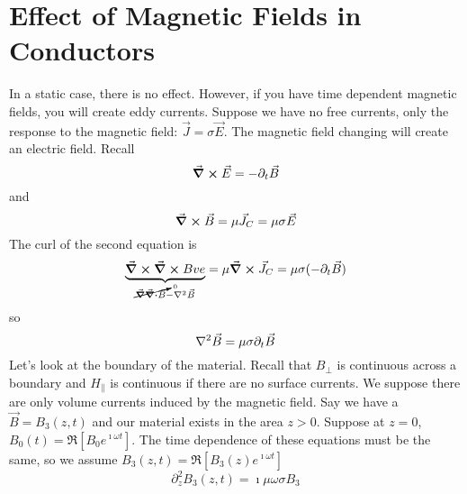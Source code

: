 \documentclass[a4paper,twoside,master.tex]{subfiles}
\begin{document}
\section{Effect of Magnetic Fields in Conductors}
\label{sec:effect_of_magnetic_fields_in_conductors}

In a static case, there is no effect. However, if you have time dependent magnetic fields, you will create eddy currents. Suppose we have no free currents, only the response to the magnetic field: $ \vec{J} = \sigma \vec{E} $. The magnetic field changing will create an electric field. Recall
\begin{equation}
    \curl{ \vec{E}} = -\partial_t \vec{B}
\end{equation}
and
\begin{equation}
    \curl{ \vec{B}} = \mu \vec{J}_C = \mu \sigma \vec{E} 
\end{equation}
The curl of the second equation is
\begin{equation}
    \underbrace{\curl{ \curl{ B ve}}}_{\cancelto{0}{\grad{\div{ \vec{B}}}} - \laplacian{ \vec{B}}} = \mu \curl{ \vec{J}_C} = \mu \sigma (-\partial_t \vec{B})
\end{equation}
so
\begin{equation}
    \laplacian{ \vec{B}} = \mu \sigma \partial_t \vec{B}
\end{equation}
Let's look at the boundary of the material. Recall that $ B_\perp $ is continuous across a boundary and $ H_\parallel $ is continuous if there are no surface currents. We suppose there are only volume currents induced by the magnetic field. Say we have a $ \vec{B} = B_3(z,t) $ and our material exists in the area $ z > 0 $. Suppose at $ z=0 $, $ B_0(t) = \Re[B_0 e^{\imath\omega t}] $. The time dependence of these equations must be the same, so we assume $ B_3(z,t) =\Re[B_3(z) e^{\imath \omega t}] $ 
\begin{equation}
    \partial_z^2 B_3(z,t) = \imath \mu \omega \sigma B_3
\end{equation}
\end{document}

